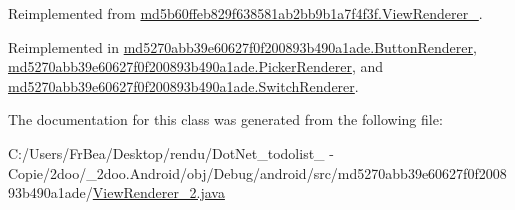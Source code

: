 Reimplemented from \hyperlink{classmd5b60ffeb829f638581ab2bb9b1a7f4f3f_1_1_view_renderer__2_6c151401977148a92c515e9c7de1aaf8}{md5b60ffeb829f638581ab2bb9b1a7f4f3f.ViewRenderer\_}.

Reimplemented in \hyperlink{classmd5270abb39e60627f0f200893b490a1ade_1_1_button_renderer_2a4a0404703b01e8d3b5f88cd8313a90}{md5270abb39e60627f0f200893b490a1ade.ButtonRenderer}, \hyperlink{classmd5270abb39e60627f0f200893b490a1ade_1_1_picker_renderer_63b7af8001f6b5d63bc7d868b9d12d4c}{md5270abb39e60627f0f200893b490a1ade.PickerRenderer}, and \hyperlink{classmd5270abb39e60627f0f200893b490a1ade_1_1_switch_renderer_a9fe52d28f98ed4682e97e2a914a77b5}{md5270abb39e60627f0f200893b490a1ade.SwitchRenderer}.

The documentation for this class was generated from the following file:\begin{CompactItemize}
\item 
C:/Users/FrBea/Desktop/rendu/DotNet\_\-todolist\_ - Copie/2doo/\_\-2doo.Android/obj/Debug/android/src/md5270abb39e60627f0f200893b490a1ade/\hyperlink{md5270abb39e60627f0f200893b490a1ade_2_view_renderer__2_8java}{ViewRenderer\_\-2.java}\end{CompactItemize}
